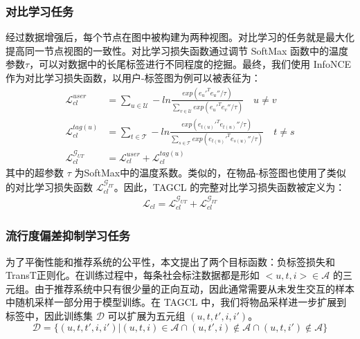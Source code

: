 \subsubsection{对比学习任务}
经过数据增强后，每个节点在图中被构建为两种视图。对比学习的任务就是最大化提高同一节点视图的一致性。对比学习损失函数通过调节 SoftMax 函数中的温度参数$\tau$，可以对数据中的长尾标签进行不同程度的挖掘。最终，我们使用 InfoNCE \cite{oord_rl4cp_2018} 作为对比学习损失函数，以用户-标签图为例可以被表征为：
\begin{equation}
    \begin{aligned}
        \mathcal{L}_{cl}^{user} &= \sum_{u \in \mathcal{U}} -ln{\frac{exp(e_u'^T e_u''/\tau)}{\sum_{v \in \mathcal{U}}exp(e_u'^T e_{v}''/\tau)}} \quad u \neq v  \\
        \mathcal{L}_{cl}^{tag(u)} &= \sum_{t \in \mathcal{T}} -ln{\frac{exp(e_{t(u)}'^T e_{t(u)}''/\tau)}{\sum_{s \in \mathcal{T}}exp(e_{t(u)}'^T e_{s(u)}''/\tau)}} \quad t \neq s  \\
        \mathcal{L}_{cl}^{\mathcal{G}_{UT}} &= \mathcal{L}_{cl}^{user} + \mathcal{L}_{cl}^{tag(u)} 
        \label{infonce}
    \end{aligned}
\end{equation}
其中的超参数 $\tau$ 为SoftMax中的温度系数。类似的，在物品-标签图也使用了类似的对比学习损失函数 $\mathcal{L}_{cl}^{\mathcal{G}_{IT}}$。因此，TAGCL 的完整对比学习损失函数被定义为：
\begin{equation}
    \begin{aligned}
        \mathcal{L}_{cl} = \mathcal{L}_{cl}^{\mathcal{G}_{UT}} + \mathcal{L}_{cl}^{\mathcal{G}_{IT}}
    \end{aligned}
\end{equation}

\subsubsection{流行度偏差抑制学习任务}
为了平衡性能和推荐系统的公平性，本文提出了两个目标函数：负标签损失和TransT正则化。在训练过程中，每条社会标注数据都是形如 $<u, t, i> \in \mathcal{A}$ 的三元组。由于推荐系统中只有很少量的正向互动，因此通常需要从未发生交互的样本中随机采样一部分用于模型训练。在 TAGCL 中，我们将物品采样进一步扩展到标签中，因此训练集 $\mathcal{D}$ 可以扩展为五元组 $(u, t, t', i, i')$。
\begin{equation}
    \mathcal{D} = \{(u, t, t', i, i')|(u, t, i) \in \mathcal{A} \cap (u, t',i) \notin \mathcal{A} \cap (u, t,i') \notin \mathcal{A} \} 
\end{equation}

